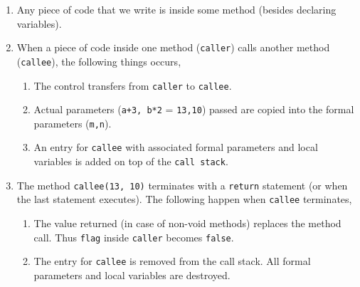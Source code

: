 \begin{enumerate}
  \item Any piece of code that we write is inside some method (besides declaring variables).
  \item When a piece of code inside one method (\texttt{caller}) calls another method (\texttt{callee}), the following things occurs,
  \begin{enumerate}
  \item The control transfers from \texttt{caller} to \texttt{callee}. 
  \item Actual parameters (\texttt{a+3, b*2} = \texttt{13,10}) passed are copied into the formal parameters (\texttt{m,n}). 
  \item An entry for \texttt{callee} with associated formal parameters and local variables is added on top of the \texttt{call stack}.
  \end{enumerate}

  \item The method \texttt{callee(13, 10)} terminates with a \texttt{return} statement (or when the last statement  executes). The following happen when \texttt{callee} terminates,
  \begin{enumerate}
  \item The value returned (in case of non-void methods) replaces the method call. Thus \texttt{flag} inside \texttt{caller} becomes \texttt{false}.
  \item The entry for \texttt{callee} is removed from the call stack. All formal parameters and local variables are destroyed.
  \end{enumerate}
\end{enumerate}

